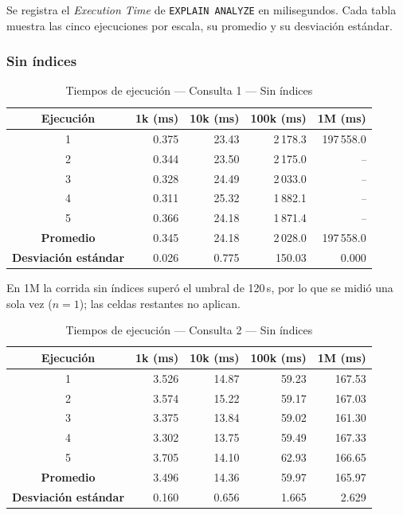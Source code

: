 Se registra el \textit{Execution Time} de \texttt{EXPLAIN ANALYZE} en
milisegundos. Cada tabla muestra las cinco ejecuciones por escala, su promedio
y su desviación estándar.

\subsubsection{Sin índices}

\begin{table}[H]
\centering
\small
\caption{Tiempos de ejecución --- Consulta 1 --- Sin índices}
\begin{tabular}{|c|r|r|r|r|}
\hline
\textbf{Ejecución} & \textbf{1k (ms)} & \textbf{10k (ms)} & \textbf{100k (ms)} & \textbf{1M (ms)} \\ \hline
1 & 0.375 & 23.43 & 2\,178.3 & 197\,558.0 \\ \hline
2 & 0.344 & 23.50 & 2\,175.0 & \textit{--} \\ \hline
3 & 0.328 & 24.49 & 2\,033.0 & \textit{--} \\ \hline
4 & 0.311 & 25.32 & 1\,882.1 & \textit{--} \\ \hline
5 & 0.366 & 24.18 & 1\,871.4 & \textit{--} \\ \hline
\textbf{Promedio} & 0.345 & 24.18 & 2\,028.0 & 197\,558.0 \\ \hline
\textbf{Desviación estándar} & 0.026 & 0.775 & 150.03 & 0.000 \\ \hline
\end{tabular}
\par\footnotesize En 1M la corrida sin índices superó el umbral de 120\,s, por lo que se midió una sola vez ($n=1$); las celdas restantes no aplican.
\end{table}

\begin{table}[H]
\centering
\small
\caption{Tiempos de ejecución --- Consulta 2 --- Sin índices}
\begin{tabular}{|c|r|r|r|r|}
\hline
\textbf{Ejecución} & \textbf{1k (ms)} & \textbf{10k (ms)} & \textbf{100k (ms)} & \textbf{1M (ms)} \\ \hline
1 & 3.526 & 14.87 & 59.23 & 167.53 \\ \hline
2 & 3.574 & 15.22 & 59.17 & 167.03 \\ \hline
3 & 3.375 & 13.84 & 59.02 & 161.30 \\ \hline
4 & 3.302 & 13.75 & 59.49 & 167.33 \\ \hline
5 & 3.705 & 14.10 & 62.93 & 166.65 \\ \hline
\textbf{Promedio} & 3.496 & 14.36 & 59.97 & 165.97 \\ \hline
\textbf{Desviación estándar} & 0.160 & 0.656 & 1.665 & 2.629 \\ \hline
\end{tabular}

\end{table}

